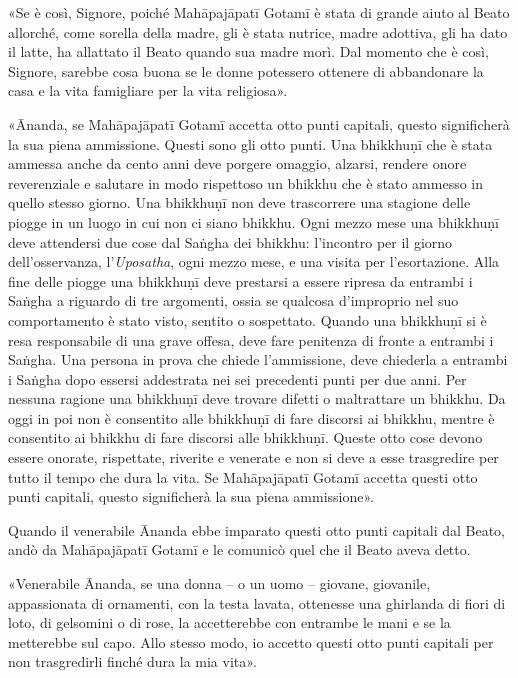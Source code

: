«Se è così, Signore, poiché Mahāpajāpatī Gotamī è stata di grande aiuto
al Beato allorché, come sorella della madre, gli è stata nutrice, madre
adottiva, gli ha dato il latte, ha allattato il Beato quando sua madre
morì. Dal momento che è così, Signore, sarebbe cosa buona se le donne
potessero ottenere di abbandonare la casa e la vita famigliare per la
vita religiosa».


«Ānanda, se Mahāpajāpatī Gotamī accetta otto punti capitali, questo
significherà la sua piena ammissione. Questi sono gli otto punti. Una
bhikkhuṇī che è stata ammessa anche da cento anni deve porgere omaggio,
alzarsi, rendere onore reverenziale e salutare in modo rispettoso un
bhikkhu che è stato ammesso in quello stesso giorno. Una bhikkhuṇī non
deve trascorrere una stagione delle piogge in un luogo in cui non ci
siano bhikkhu. Ogni mezzo mese una bhikkhuṇī deve attendersi due cose
dal Saṅgha dei bhikkhu: l’incontro per il giorno dell’osservanza,
l’\emph{Uposatha}, ogni mezzo mese, e una visita per l’esortazione. Alla fine
delle piogge una bhikkhuṇī deve prestarsi a essere ripresa da entrambi i
Saṅgha a riguardo di tre argomenti, ossia se qualcosa d’improprio nel
suo comportamento è stato visto, sentito o sospettato. Quando una
bhikkhuṇī si è resa responsabile di una grave offesa, deve fare
penitenza di fronte a entrambi i Saṅgha. Una persona in prova che chiede
l’ammissione, deve chiederla a entrambi i Saṅgha dopo essersi addestrata
nei sei precedenti punti per due anni. Per nessuna ragione una bhikkhuṇī
deve trovare difetti o maltrattare un bhikkhu. Da oggi in poi non è
consentito alle bhikkhuṇī di fare discorsi ai bhikkhu, mentre è
consentito ai bhikkhu di fare discorsi alle bhikkhuṇī. Queste otto cose
devono essere onorate, rispettate, riverite e venerate e non si deve a
esse trasgredire per tutto il tempo che dura la vita. Se Mahāpajāpatī
Gotamī accetta questi otto punti capitali, questo significherà la sua
piena ammissione».


Quando il venerabile Ānanda ebbe imparato questi otto punti capitali dal
Beato, andò da Mahāpajāpatī Gotamī e le comunicò quel che il Beato aveva
detto.


«Venerabile Ānanda, se una donna – o un uomo – giovane, giovanile,
appassionata di ornamenti, con la testa lavata, ottenesse una ghirlanda
di fiori di loto, di gelsomini o di rose, la accetterebbe con entrambe
le mani e se la metterebbe sul capo. Allo stesso modo, io accetto questi
otto punti capitali per non trasgredirli finché dura la mia vita».


